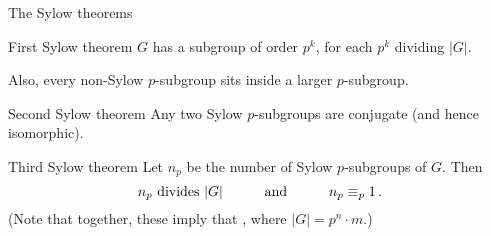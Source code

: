 \documentclass[8pt, handout]{beamer}
\begin{document}
\begin{frame}{The Sylow theorems}

  \begin{block}{First Sylow theorem} 
    $G$ has a subgroup of order $p^k$, for each $p^k$ dividing
    $|G|$. \medskip
    
    Also, every non-Sylow $p$-subgroup sits inside a larger
    $p$-subgroup.
  \end{block}

  \begin{block}{Second Sylow theorem}
    Any two Sylow $p$-subgroups are conjugate (and hence isomorphic).
  \end{block}  

  \begin{block}{Third Sylow theorem}
    Let $n_p$ be the number of Sylow $p$-subgroups of $G$.  Then
    \[
    \mbox{$n_p$ divides $|G|$}\qquad\quad\mbox{and}\qquad\quad
    n_p\equiv_p 1\,. \vspace{-2mm}
    \]
    (Note that together, these imply that , where
    $|G|=p^n\cdot m$.)
  \end{block}
  
\end{frame}

\end{document}
